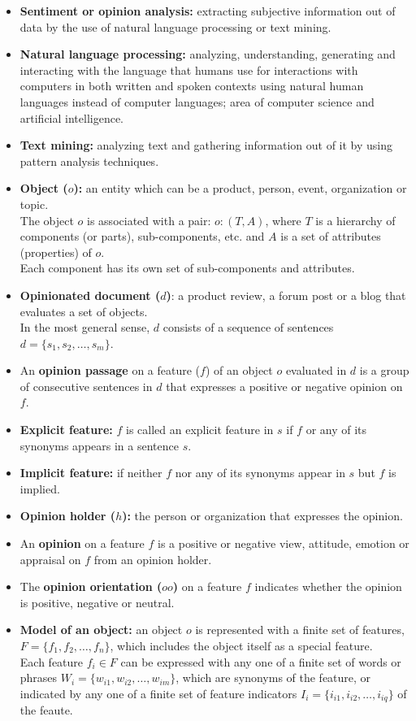 \documentclass[a4paper, landscape, 6pt, fleqn]{scrartcl}
\renewcommand{\emph}[1]{\textbf{#1}}
\begin{document}
\begin{multicols*}{4}
\begin{itemize}
\item \emph{Sentiment or opinion analysis:} extracting subjective information out of data by the use of natural language processing or text mining.
\item \emph{Natural language processing:} analyzing, understanding, generating and interacting with the language that humans use for interactions with computers in both written and spoken contexts using natural human languages instead of computer languages; area of computer science and artificial intelligence.
\item \emph{Text mining:} analyzing text and gathering information out of it by using pattern analysis techniques.
\item \emph{Object ($o$):} an entity which can be a product, person, event, organization or topic. \\
The object $o$ is associated with a pair: $o: (T,A)$, where $T$ is a hierarchy of components (or parts), sub-components, etc. and $A$ is a set of attributes (properties) of $o$. \\
Each component has its own set of sub-components and attributes.
\item \emph{Opinionated document ($d$)}: a product review, a forum post or a blog that evaluates a set of objects. \\
In the most general sense, $d$ consists of a sequence of sentences $d=\lbrace s_1,s_2,\ldots,s_m \rbrace$.
\item An \emph{opinion passage} on a feature ($f$) of an object $o$ evaluated in $d$ is a group of consecutive sentences in $d$ that expresses a positive or negative opinion on $f$.
\item \emph{Explicit feature:} $f$ is called an explicit feature in $s$ if $f$ or any of its synonyms appears in a sentence $s$.
\item \emph{Implicit feature:} if neither $f$ nor any of its synonyms appear in $s$ but $f$ is implied.
\item \emph{Opinion holder ($h$):} the person or organization that expresses the opinion.
\item An \emph{opinion} on a feature $f$ is a positive or negative view, attitude, emotion or appraisal on $f$ from an opinion holder.
\item The \emph{opinion orientation ($oo$)} on a feature $f$ indicates whether the opinion is positive, negative or neutral.
\item \emph{Model of an object:} an object $o$ is represented with a finite set of features, $F = \lbrace f_1,f_2,\ldots,f_n \rbrace$, which includes the object itself as a special feature. \\
Each feature $f_i \in F$ can be expressed with any one of a finite set of words or phrases $W_i = \lbrace w_{i1},w_{i2},\ldots,w_{im} \rbrace$, which are synonyms of the feature, or indicated by any one of a finite set of feature indicators $I_i = \lbrace i_{i1},i_{i2},\ldots,i_{iq} \rbrace$ of the feaute.
\end{itemize}


\end{multicols*}
\end{document}
